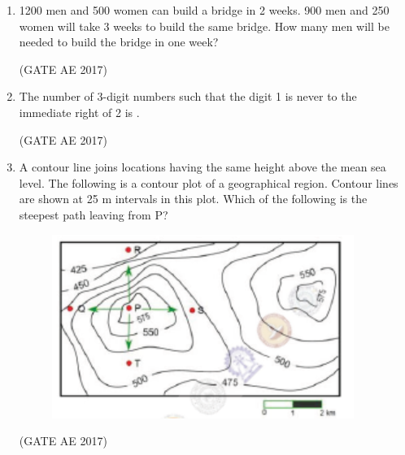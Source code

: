 \documentclass[journal,12pt,onecolumn]{IEEEtran}
\theoremstyle{remark}
\begin{document}
\begin{flushleft}
\begin{enumerate}
\item 1200 men and 500 women can build a bridge in 2 weeks. 900 men and 250 women will take 3 weeks to build the same bridge. How many men will be needed to build the bridge in one week?

\hfill (GATE AE 2017)

\begin{enumerate}
\end{enumerate}

\item The number of 3-digit numbers such that the digit 1 is never to the immediate right of 2 is \underline{\hspace{2cm}}.

\hfill (GATE AE 2017)

\begin{enumerate}
\end{enumerate}

\item A contour line joins locations having the same height above the mean sea level. The following is a contour plot of a geographical region. Contour lines are shown at 25 m intervals in this plot. Which of the following is the steepest path leaving from P?

\begin{figure}[H]
    \centering
    \includegraphics[width=0.5\columnwidth]{figs/65.png}
    \caption{}
    \label{fig:placeholder}
\end{figure}

\hfill (GATE AE 2017)

\begin{enumerate}
\end{enumerate}


\end{enumerate}

\end{flushleft}
\end{document}
